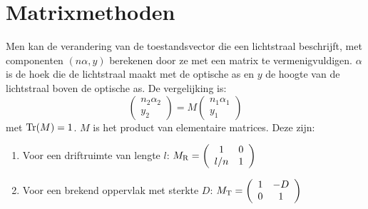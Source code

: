 \section{Matrixmethoden}
Men kan de verandering van de toestandsvector die een lichtstraal beschrijft,
met componenten $(n\alpha,y)$ berekenen door ze met een matrix te
vermenigvuldigen. $\alpha$ is de hoek die de lichtstraal maakt met de optische
as en $y$ de hoogte van de lichtstraal boven de optische as. De vergelijking
is:
\[
\left(\begin{array}{c}n_2\alpha_2\\y_2\end{array}\right)=M
\left(\begin{array}{c}n_1\alpha_1\\y_1\end{array}\right)
\]
met ${\rm Tr}(M)=1$. $M$ is het product van elementaire matrices. Deze zijn:
\begin{enumerate}
\item Voor een driftruimte van lengte $l$: $\displaystyle M_{\rm R}=
      \left(\begin{array}{cc}1&0\\l/n&1\end{array}\right)$
\item Voor een brekend oppervlak met sterkte $D$: $\displaystyle M_{\rm T}=
      \left(\begin{array}{cc}1&-D\\0&1\end{array}\right)$
\end{enumerate}

